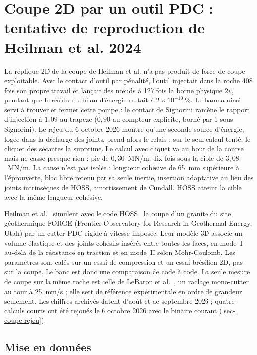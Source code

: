 \section{Coupe 2D par un outil PDC : tentative de reproduction de Heilman et al. 2024}
\label{sec-coupe}

La réplique 2D de la coupe de Heilman et al. n'a pas produit de force de coupe exploitable. Avec le contact d'outil par pénalité, l'outil injectait dans la roche 408 fois son propre travail et lançait des nœuds à 127 fois la borne physique $2v$, pendant que le résidu du bilan d'énergie restait à $2\times10^{-10}~\%$. Le banc a ainsi servi à trouver et fermer cette pompe : le contact de Signorini ramène le rapport d'injection à $1{,}09$ au trapèze ($0{,}90$ au compteur explicite, borné par 1 sous Signorini). Le rejeu du 6 octobre 2026 montre qu'une seconde source d'énergie, logée dans la décharge  des joints, prend alors le relais ; sur le seul calcul tenté, le cliquet des sécantes la supprime. Le calcul avec cliquet va au bout de la course mais ne casse presque rien : pic de $0{,}30$~MN/m, dix fois sous la cible de $3{,}08$~MN/m. La cause n'est pas isolée : longueur cohésive de 65~mm supérieure à l'éprouvette, bloc libre retenu par sa seule inertie, insertion adaptative au lieu des joints intrinsèques de HOSS, amortissement de Cundall. HOSS atteint la cible avec la même longueur cohésive.

Heilman et al.~\cite{heilman2024pdc} simulent avec le code HOSS~\cite{knight2020hoss} la coupe d'un granite du site géothermique FORGE (Frontier Observatory for Research in Geothermal Energy, Utah) par un cutter PDC rigide à vitesse imposée. Leur modèle 3D associe un volume élastique et des joints cohésifs insérés entre toutes les faces, en mode~I au-delà de la résistance en traction et en mode~II selon Mohr-Coulomb. Les paramètres sont calés sur un essai de compression et un essai brésilien 2D, pas sur la coupe. Le banc est donc une comparaison de code à code. La seule mesure de coupe sur la même roche est celle de LeBaron et al.~\cite{lebaron2023forge}, un raclage mono-cutter au tour à 25~mm/s ; elle sert de référence expérimentale en ordre de grandeur seulement. Les chiffres archivés datent d'août et de septembre 2026 ; quatre calculs courts ont été rejoués le 6 octobre 2026 avec le binaire courant (\cref{sec-coupe-rejeu}).

\subsection{Mise en données}

